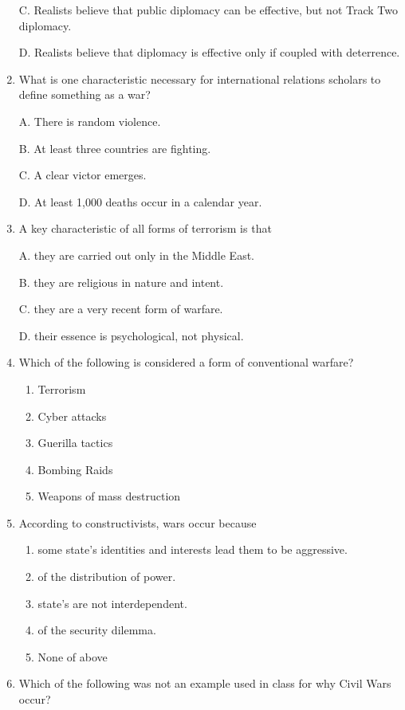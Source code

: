 \documentclass[
]{book}
\begin{document}
\begin{enumerate}
  C. Realists believe that public diplomacy can be effective, but not Track Two diplomacy.

  D. Realists believe that diplomacy is effective only if coupled with deterrence.
\item
  What is one characteristic necessary for international relations scholars to define something as a war?

  A. There is random violence.

  B. At least three countries are fighting.

  C. A clear victor emerges.

  D. At least 1,000 deaths occur in a calendar year.
\item
  A key characteristic of all forms of terrorism is that

  A. they are carried out only in the Middle East.

  B. they are religious in nature and intent.

  C. they are a very recent form of warfare.

  D. their essence is psychological, not physical.
\item
  Which of the following is considered a form of conventional warfare?

  \begin{enumerate}
  \def\labelenumii{\Alph{enumii}.}
  \item
    Terrorism
  \item
    Cyber attacks
  \item
    Guerilla tactics
  \item
    Bombing Raids
  \item
    Weapons of mass destruction
  \end{enumerate}
\item
  According to constructivists, wars occur because

  \begin{enumerate}
  \def\labelenumii{\Alph{enumii}.}
  \item
    some state's identities and interests lead them to be aggressive.
  \item
    of the distribution of power.
  \item
    state's are not interdependent.
  \item
    of the security dilemma.
  \item
    None of above
  \end{enumerate}
\item
  Which of the following was not an example used in class for why Civil Wars occur?


\end{enumerate}
\end{document}
